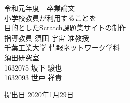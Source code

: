 \documentclass[a4j,10pt]{jsarticle}
\begin{document}
\setcounter{tocdepth}{3}
\thispagestyle{empty}
\begin{center}
\huge
令和元年度　卒業論文\\[50pt]


\HUGE
小学校教員が利用することを\\
目的としたScratch課題集サイトの制作\\[50pt]
\huge
指導教員 須田 宇宙 准教授\\[40pt]
千葉工業大学 情報ネットワーク学科\\[10pt]
須田研究室\\[60pt]
1632075 \hspace{70pt} 坂下 駿也\\[75pt]
1632093 \hspace{70pt} 世戸 祥貴\\[75pt]
\end{center}
\begin{flushright}
\huge



提出日 2020年1月29日
\end{flushright}
\newpage


\pagestyle{empty}
\large
\tableofcontents
\listoftables
\listoffigures
\newpage


\pagestyle{plain}
\setcounter{page}{1}
























\end{document}

